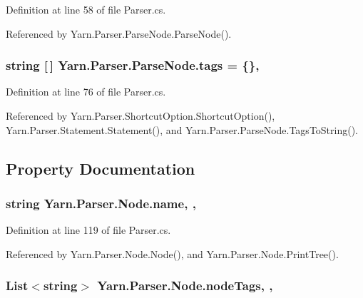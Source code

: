 Definition at line 58 of file Parser.\-cs.



Referenced by Yarn.\-Parser.\-Parse\-Node.\-Parse\-Node().

\hypertarget{a00138_a58b3a15788fd2d4127d73619dc6d04ae}{
\subsubsection[{tags}]{\setlength{\rightskip}{0pt plus 5cm}string \mbox{[}$\,$\mbox{]} Yarn.\-Parser.\-Parse\-Node.\-tags = \{\}\hspace{0.3cm}{\ttfamily [package]}, {\ttfamily [inherited]}}}\label{a00138_a58b3a15788fd2d4127d73619dc6d04ae}


Definition at line 76 of file Parser.\-cs.



Referenced by Yarn.\-Parser.\-Shortcut\-Option.\-Shortcut\-Option(), Yarn.\-Parser.\-Statement.\-Statement(), and Yarn.\-Parser.\-Parse\-Node.\-Tags\-To\-String().



\subsection{Property Documentation}
\hypertarget{a00128_a3cfa07840da3a7a92c820788e902aefb}{
\subsubsection[{name}]{\setlength{\rightskip}{0pt plus 5cm}string Yarn.\-Parser.\-Node.\-name\hspace{0.3cm}{\ttfamily [get]}, {\ttfamily [set]}, {\ttfamily [package]}}}\label{a00128_a3cfa07840da3a7a92c820788e902aefb}


Definition at line 119 of file Parser.\-cs.



Referenced by Yarn.\-Parser.\-Node.\-Node(), and Yarn.\-Parser.\-Node.\-Print\-Tree().

\hypertarget{a00128_a7b1e55929dd7c9b1b0349a70d1787f2a}{
\subsubsection[{node\-Tags}]{\setlength{\rightskip}{0pt plus 5cm}List$<$string$>$ Yarn.\-Parser.\-Node.\-node\-Tags\hspace{0.3cm}{\ttfamily [get]}, {\ttfamily [set]}, {\ttfamily [package]}}}\label{a00128_a7b1e55929dd7c9b1b0349a70d1787f2a}


